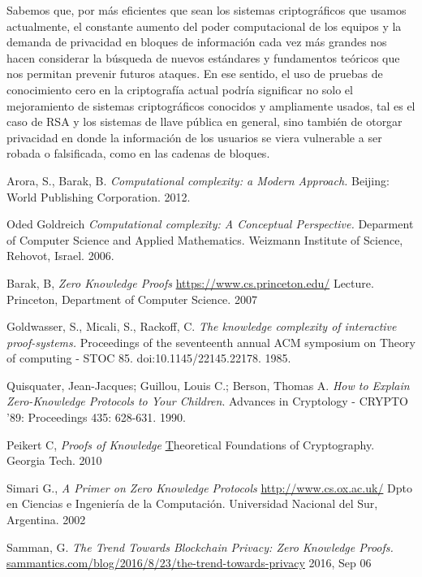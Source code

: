 \documentclass[oneside,10pt]{article}
\begin{document}
Sabemos que, por más eficientes que sean los sistemas criptográficos que usamos actualmente, el constante aumento del poder computacional de los equipos y la demanda de privacidad en bloques de información cada vez más grandes nos hacen considerar la búsqueda de nuevos estándares y fundamentos teóricos que nos permitan prevenir futuros ataques.  En ese sentido, el uso de pruebas de conocimiento cero en la criptografía actual podría significar no solo el mejoramiento de sistemas criptográficos conocidos y ampliamente usados, tal es el caso de RSA y los sistemas de llave pública en general, sino también de otorgar privacidad en donde la información de los usuarios se viera vulnerable a ser robada o falsificada, como en las cadenas de bloques. 
\begin{thebibliography}{99}

  Arora, S.,  Barak, B. 
  \emph{Computational complexity: a Modern Approach.}
  Beijing: World Publishing Corporation.
  2012.

  Oded Goldreich
  \emph{Computational complexity: A Conceptual Perspective.}
  Deparment of Computer Science and Applied Mathematics.
  Weizmann Institute of Science, Rehovot, Israel.
  2006.
  
  Barak, B,
  \emph{Zero Knowledge Proofs}
  \href{https://www.cs.princeton.edu/courses/archive/fall07/cos433/lec15.pdf}
       {https://www.cs.princeton.edu/}
       Lecture.
       Princeton, Department of Computer Science.
       2007

  Goldwasser, S., Micali, S.,  Rackoff, C.
  \emph{The knowledge complexity of interactive proof-systems.}
  Proceedings of the seventeenth annual ACM symposium on Theory of computing - STOC 85.
  doi:10.1145/22145.22178.
  1985.

  Quisquater, Jean-Jacques; Guillou, Louis C.; Berson, Thomas A.
  \emph{How to Explain Zero-Knowledge Protocols to Your Children}.
  Advances in Cryptology - CRYPTO '89:
  Proceedings 435: 628-631.
  1990.

  Peikert C,
  \emph{Proofs of Knowledge}
  \href{https://wiki.cc.gatech.edu/theory/images/5/54/Lec18.pdf}
  Theoretical Foundations of Cryptography.
  Georgia Tech.
  2010

  Simari G.,
  \emph{A Primer on Zero Knowledge Protocols}
  \href{http://www.cs.ox.ac.uk/people/gerardo.simari/personal/publications/zkp-simari2002.pdf}
  {http://www.cs.ox.ac.uk/}
  Dpto en Ciencias e Ingeniería de la Computación.
  Universidad Nacional del Sur, Argentina.
  2002
  
  Samman, G.
  \emph{The Trend Towards Blockchain Privacy: Zero Knowledge Proofs.}
  \href{http://sammantics.com/blog/2016/8/23/the-trend-towards-privacy-how-blockchains-plan-to-accomplish-this}
  {sammantics.com/blog/2016/8/23/the-trend-towards-privacy}
  2016, Sep 06

\end{thebibliography}
\end{document}
